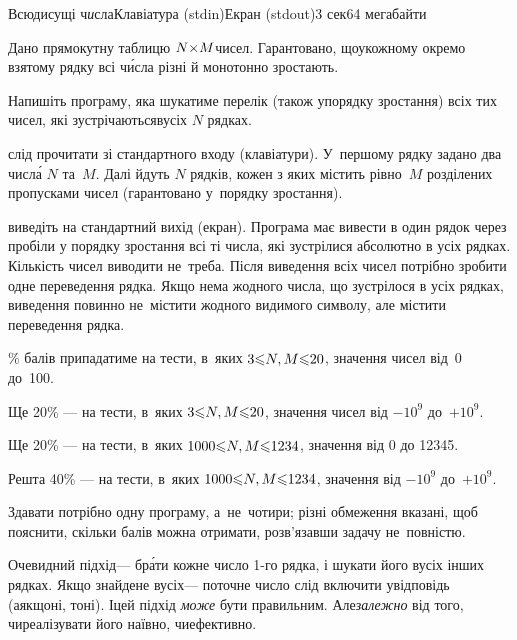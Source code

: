 \documentclass[14pt,a4paper]{extarticle}
\begin{document}
\begin{problem}{Всюдисущі ч\emph{и}сла}{Клавіатура (stdin)}{Екран (stdout)}{3 сек}{64 мегабайти}

Дано прямокутну таблицю $N{\times}M$\nolinebreak[3] чисел. Гарантовано, що\nolinebreak[2] у\nolinebreak[3] кожному окремо взятому рядку всі ч\'{и}сла різні й монотонно зростають.

Напишіть програму, яка шукатиме перелік (також у\nolinebreak[3] порядку зростання) всіх тих чисел, які зустрічаються\linebreak[1] в\nolinebreak[3] усіх $N$ рядках.

\InputFile	слід прочитати зі стандартного входу (клавіатури). У~першому рядку задано два числ\'{а} $N$ та~$M$. Далі йдуть $N$ рядків, кожен з яких містить рівно~$M$ розділених пропусками чисел (гарантовано у~порядку зростання). 

\OutputFile	виведіть на стандартний вихід (екран). Програма має вивести в один рядок через пробіли у порядку зростання всі ті числа, які зустрілися абсолютно в усіх рядках. Кількість чисел виводити не~треба. Після виведення всіх чисел потрібно зробити одне переведення рядка. Якщо нема жодного числа, що зустрілося в усіх рядках, виведення повинно не~містити жодного видимого символу, але містити переведення рядка.


\Example
\begin{exampleSimple}{6em}{3em}%
%
\end{exampleSimple}

\% балів припадатиме на тести, в~яких $3{\leqslant}{N,M}{\leqslant}20$, значення чисел від~0 до~100.

Ще 20\% --- на тести, в~яких $3{\leqslant}{N,M}{\leqslant}20$, значення чисел від $-10^9$ до~$+10^9$.

Ще 20\% --- на тести, в~яких $1000{\leqslant}{N,M}{\leqslant}1234$, значення від 0 до 12345.

Решта 40\% --- на тести, в~яких $1000{\leqslant}{N,M}{\leqslant}1234$, значення від $-10^9$ до~$+10^9$.

Здавати потрібно одну програму, а~не~чотири; різні обмеження вказані, щоб пояснити, скільки балів можна отримати, розв’язавши задачу не~повністю.


\end{problem}
	

\Tutorial	
Очевидний підхід\nolinebreak[3] --- бр\'{а}ти кожне число \mbox{1-го} рядка, і шукати його в\nolinebreak[3] усіх інших рядках. Якщо знайдене в\nolinebreak[3] усіх\nolinebreak[3] --- поточне число слід включити у\nolinebreak[3] відповідь (а\nolinebreak[3] якщо\nolinebreak[2] ні, то\nolinebreak[3] ні).
І\nolinebreak[3] цей підхід \emph{може} бути правильним. Але\nolinebreak[2] \emph{залежно} від того, чи\nolinebreak[3] реалізувати його наївно, чи\nolinebreak[3] ефективно. 
\end{document}
